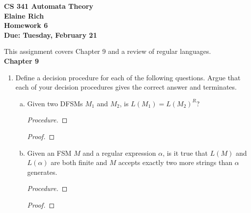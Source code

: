 \documentclass[10pt]{article}
\begin{document}
\begin{center}
\textbf{
CS 341 Automata Theory \\
Elaine Rich \\
Homework 6 \\
Due: Tuesday, February 21}\\
\end{center}
\noindent
This assignment covers Chapter 9 and a review of regular languages. \\

\noindent
\textbf{Chapter 9}
\begin{enumerate}[1)]

\item
Define a decision procedure for each of the following questions.  Argue that each of your decision procedures 
gives the correct answer and terminates.
\begin{enumerate}[a)]
\item
Given two DFSMs $M_1$ and $M_2$, is $L(M_1) = L(M_2)^R$?
\begin{proof}[Procedure]
\end{proof}
\begin{proof}[Proof]
\end{proof}

\item
Given an FSM $M$ and a regular expression $\alpha$, is it true that $L(M)$ and $L(\alpha)$ are both finite and $M$ accepts exactly two more strings than $\alpha$ generates.
\begin{proof}[Procedure]
\end{proof}
\begin{proof}[Proof]
\end{proof}
\end{enumerate}
\end{enumerate}
\end{document}
